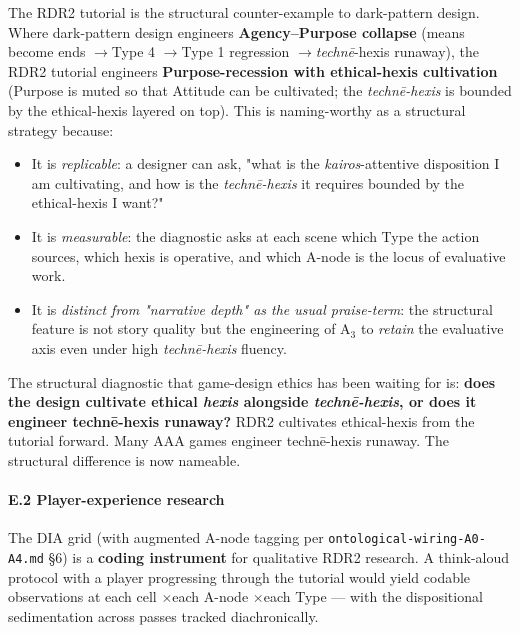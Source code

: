 \documentclass[11pt]{report}
\begin{document}
The RDR2 tutorial is the structural counter-example to dark-pattern design. Where dark-pattern design engineers \textbf{Agency–Purpose collapse} (means become ends $\rightarrow$\allowbreak  Type 4 $\rightarrow$\allowbreak  Type 1 regression $\rightarrow$\allowbreak  \textit{technē}-hexis runaway), the RDR2 tutorial engineers \textbf{Purpose-recession with ethical-hexis cultivation} (Purpose is muted so that Attitude can be cultivated; the \textit{technē-hexis} is bounded by the ethical-hexis layered on top). This is naming-worthy as a structural strategy because:


\begin{itemize}
\item It is \textit{replicable}: a designer can ask, "what is the \textit{kairos}-attentive disposition I am cultivating, and how is the \textit{technē-hexis} it requires bounded by the ethical-hexis I want?"
\item It is \textit{measurable}: the diagnostic asks at each scene which Type the action sources, which hexis is operative, and which A-node is the locus of evaluative work.
\item It is \textit{distinct from "narrative depth" as the usual praise-term}: the structural feature is not story quality but the engineering of A$_3$ to \textit{retain} the evaluative axis even under high \textit{technē-hexis} fluency.
\end{itemize}


The structural diagnostic that game-design ethics has been waiting for is: \textbf{does the design cultivate ethical \textit{hexis} alongside \textit{technē-hexis}, or does it engineer technē-hexis runaway?} RDR2 cultivates ethical-hexis from the tutorial forward. Many AAA games engineer technē-hexis runaway. The structural difference is now nameable.


\paragraph{E.2 Player-experience research}


The DIA grid (with augmented A-node tagging per \texttt{ontological-\discretionary{}{}{}wiring-\discretionary{}{}{}A0-\discretionary{}{}{}A4.\discretionary{}{}{}md} §6) is a \textbf{coding instrument} for qualitative RDR2 research. A think-aloud protocol with a player progressing through the tutorial would yield codable observations at each cell $\times$\allowbreak  each A-node $\times$\allowbreak  each Type — with the dispositional sedimentation across passes tracked diachronically.
\end{document}
